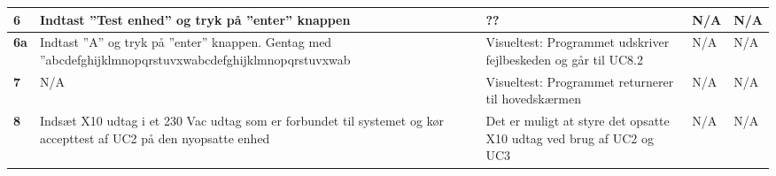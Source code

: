 \begin{center}
\begin{longtable}{|p{}|p{}|p{3cm}|p{3cm}|p{3cm}|}
\textbf{6} &
Indtast ''Test enhed'' og tryk på ''enter'' knappen &
??  &
N/A &
N/A \\\hline

\textbf{6a} &
Indtast ''A'' og tryk på ''enter'' knappen.\newline
Gentag med ''abcdefghijklmnopqrstuvxwabcdefghijklmnopqrstuvxwab &
Visueltest: Programmet udskriver fejlbeskeden og går til UC8.2 &
N/A &
N/A \\\hline

\textbf{7} &
N/A &
Visueltest: Programmet returnerer til hovedskærmen &
N/A &
N/A \\\hline

\textbf{8} &
Indsæt X10 udtag i et 230 Vac udtag som er forbundet til systemet og kør accepttest af UC2 på den nyopsatte enhed&
Det er muligt at styre det opsatte X10 udtag ved brug af UC2 og UC3&
N/A &
N/A \\\hline


	\end{longtable}
	\label{ATUC8} 
\end{center}